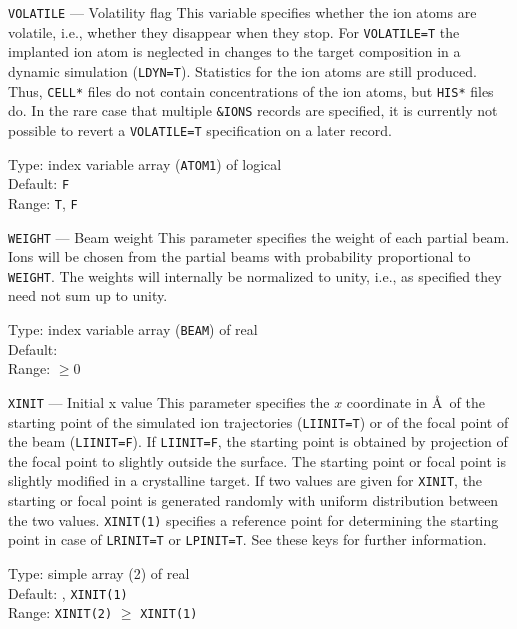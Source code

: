 \begin{keydescription}{\texttt{VOLATILE} --- Volatility flag}
%
  This variable specifies whether the ion atoms are volatile, i.e., whether
  they disappear when they stop. For \texttt{VOLATILE=T} the implanted ion atom 
  is neglected in changes to the target composition in a dynamic simulation
  (\texttt{LDYN=T}). Statistics for the ion atoms are still produced. Thus, 
  \texttt{CELL*} files do not contain concentrations of the ion atoms, but 
  \texttt{HIS*} files do. In the rare case that multiple \texttt{\&IONS} 
  records are specified, it is currently not possible to revert a 
  \texttt{VOLATILE=T} specification on a later record.
%
  \begin{keytab}
    Type:    \> index variable array (\texttt{ATOM1}) of logical \\
    Default: \> \texttt{F} \\
    Range:   \> \texttt{T}, \texttt{F}
  \end{keytab}
\end{keydescription}

\begin{keydescription}{\texttt{WEIGHT} --- Beam weight}
%
  This parameter specifies the weight of each partial beam. Ions will be chosen
  from the partial beams with probability proportional to \texttt{WEIGHT}. The
  weights will internally be normalized to unity, i.e., as specified they need
  not sum up to unity.
%
  \begin{keytab}
    Type:    \> index variable array (\texttt{BEAM}) of real \\
    Default:  \\
    Range:   \> $\ge 0$
  \end{keytab}
\end{keydescription}

\begin{keydescription}{\texttt{XINIT} --- Initial x value}
%
  This parameter specifies the $x$ coordinate in \AA\ of the starting point of
  the simulated ion trajectories (\texttt{LIINIT=T}) or of the focal point of the
  beam (\texttt{LIINIT=F}). If \texttt{LIINIT=F}, the starting point is obtained
  by projection of the focal point to slightly outside the surface. The starting
  point or focal point is slightly modified in a crystalline target. If
  two values are given for \texttt{XINIT}, the starting or focal point is
  generated randomly with uniform distribution between the two values.
  \ifprivate 
    \texttt{XINIT(1)} specifies a reference point for determining the
    starting point in case of \texttt{LRINIT=T} or \texttt{LPINIT=T}.
    See these keys for further information.
  \fi
%
  \begin{keytab}
    Type:    \> simple array (2) of real \\
    Default: , \texttt{XINIT(1)} \\
    Range:   \> \texttt{XINIT(2)} $\ge$ \texttt{XINIT(1)}
  \end{keytab}
\end{keydescription}


